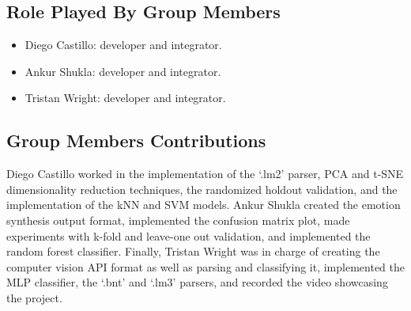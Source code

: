 \subsection{Role Played By Group Members}
\begin{itemize}
  \item Diego Castillo: developer and integrator.
  \item Ankur Shukla: developer and integrator.
  \item Tristan Wright: developer and integrator.
\end{itemize}

\subsection{Group Members Contributions}
Diego Castillo worked in the implementation of the `.lm2' parser, PCA and t-SNE dimensionality reduction techniques, the randomized holdout validation, and the implementation of the kNN and SVM models. Ankur Shukla created the emotion synthesis output format, implemented the confusion matrix plot, made experiments with k-fold  and leave-one out validation, and implemented the random forest classifier. Finally, Tristan Wright was in charge of creating the computer vision API format as well as parsing and classifying it, implemented the MLP classifier, the `.bnt' and `.lm3' parsers, and recorded the video showcasing the project.

